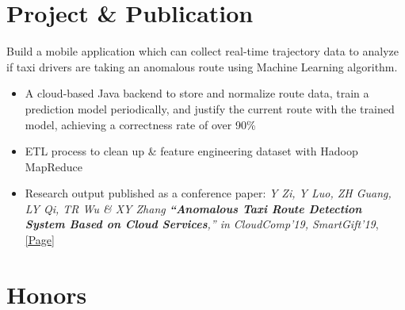 \documentclass{resume}
\begin{document}
\section{Project \& Publication}
\begin{flushleft}
Build a mobile application which can collect real-time trajectory data to analyze if taxi drivers are taking an anomalous route using Machine Learning algorithm.
\begin{itemize}
    \item A cloud-based Java backend to store and normalize route data, train a prediction model periodically, \linebreak and justify the current route with the trained model, achieving a correctness rate of over 90\%
    \item ETL process to clean up \& feature engineering dataset with Hadoop MapReduce
    \item Research output published as a conference paper: \textit{Y Zi, Y Luo, ZH Guang, LY Qi, TR Wu \& XY Zhang \textbf{``Anomalous Taxi Route Detection System Based on Cloud Services},'' in CloudComp'19, SmartGift'19}, \href{https://link.springer.com/chapter/10.1007/978-3-030-48513-9_20}{[Page]}
\end{itemize}
\end{flushleft}

\section{Honors}
\end{document}
